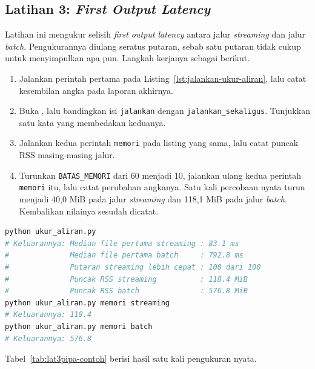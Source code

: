 \subsection*{Latihan 3: \textit{First Output Latency}}

Latihan ini mengukur selisih \textit{first output latency} antara jalur
\textit{streaming} dan jalur \textit{batch}. Pengukurannya diulang seratus
putaran, sebab satu putaran tidak cukup untuk menyimpulkan apa pun. Langkah
kerjanya sebagai berikut.

\begin{enumerate}
  \item Jalankan perintah pertama pada Listing~\ref{lst:jalankan-ukur-aliran},
    lalu catat kesembilan angka pada laporan akhirnya.
  \item Buka , lalu bandingkan isi
    \texttt{jalankan} dengan \texttt{jalankan\_sekaligus}. Tunjukkan satu kata
    yang membedakan keduanya.
  \item Jalankan kedua perintah \texttt{memori} pada listing yang sama, lalu
    catat puncak RSS masing-masing jalur.
  \item Turunkan \texttt{BATAS\_MEMORI} dari 60 menjadi 10, jalankan ulang kedua
    perintah \texttt{memori} itu, lalu catat perubahan angkanya. Satu kali
    percobaan nyata turun menjadi 40,0 MiB pada jalur \textit{streaming} dan
    118,1 MiB pada jalur \textit{batch}. Kembalikan nilainya sesudah dicatat.
\end{enumerate}

\begin{lstlisting}[language=bash, caption={Mengukur \textit{first output
  latency} beserta puncak RSS, skrip tersedia di
  \berkas{sources/chapter06/ukur_aliran.py}}, label=lst:jalankan-ukur-aliran]
python ukur_aliran.py
# Keluarannya: Median file pertama streaming : 83.1 ms
#              Median file pertama batch     : 792.8 ms
#              Putaran streaming lebih cepat : 100 dari 100
#              Puncak RSS streaming          : 118.4 MiB
#              Puncak RSS batch              : 576.8 MiB
python ukur_aliran.py memori streaming
# Keluarannya: 118.4
python ukur_aliran.py memori batch
# Keluarannya: 576.8
\end{lstlisting}

Tabel~\ref{tab:lat3pipa-contoh} berisi hasil satu kali pengukuran nyata.

